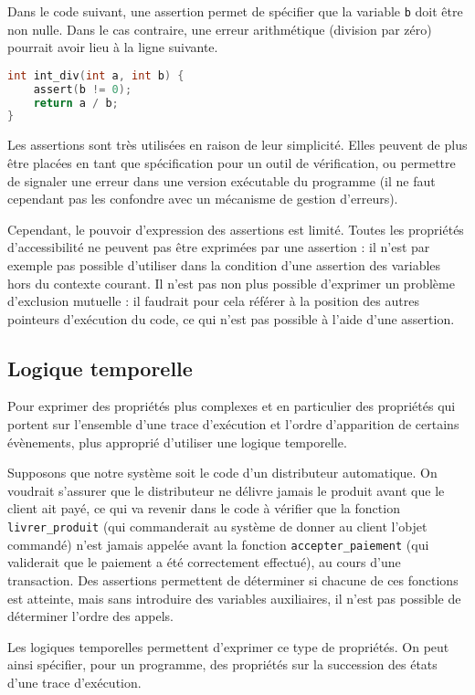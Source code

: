 Dans le code suivant, une assertion permet de spécifier que la variable
\texttt{b} doit être non nulle. Dans le cas contraire, une erreur
arithmétique (division par zéro) pourrait avoir lieu à la ligne suivante.

\begin{lstlisting}[language=C]
int int_div(int a, int b) {
    assert(b != 0);
    return a / b;
}
\end{lstlisting}

Les assertions sont très utilisées en raison de leur simplicité.
Elles peuvent de plus être placées en tant que spécification pour un outil de
vérification, ou permettre de signaler une erreur dans une version exécutable
du programme (il ne faut cependant pas les confondre avec un mécanisme de
gestion d'erreurs).

Cependant, le pouvoir d'expression des assertions est limité. Toutes les
propriétés d'accessibilité ne peuvent pas être exprimées par une assertion : il
n'est par exemple pas possible d'utiliser dans la condition d'une assertion des
variables hors du contexte courant. Il n'est pas non plus possible d'exprimer un
problème d'exclusion mutuelle : il faudrait pour cela référer à la position des
autres pointeurs d'exécution du code, ce qui n'est pas possible à l'aide d'une
assertion.

\subsection{Logique temporelle}

Pour exprimer des propriétés plus complexes et en particulier des propriétés qui
portent sur l'ensemble d'une trace d'exécution et l'ordre d'apparition de
certains évènements, plus approprié d'utiliser une logique temporelle.

Supposons que notre système soit le code d'un distributeur automatique.
On voudrait s'assurer que le distributeur ne délivre jamais le produit
avant que le client ait payé, ce qui va revenir dans le code à vérifier
que la fonction \texttt{livrer\_produit} (qui commanderait au système
de donner au client l'objet commandé) n'est jamais appelée avant la
fonction \texttt{accepter\_paiement} (qui validerait que le paiement a
été correctement effectué), au cours d'une transaction. Des assertions
permettent de déterminer si chacune de ces fonctions est atteinte, mais
sans introduire des variables auxiliaires, il n'est pas possible de
déterminer l'ordre des appels.

Les logiques temporelles permettent d'exprimer ce type de propriétés. On
peut ainsi spécifier, pour un programme, des propriétés sur la
succession des états d'une trace d'exécution.

